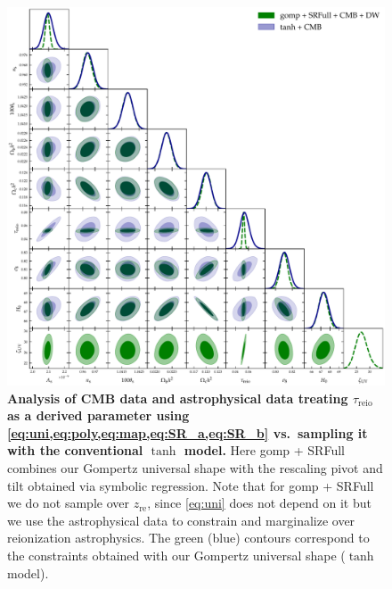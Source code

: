 \documentclass[12pt, a4paper]{article}
\newcommand{\re}{\mathrm{re}}
\newcommand{\reio}{\mathrm{reio}}
\begin{document}
\begin{figure}
\centering
\includegraphics[width=\linewidth]{figs/gomp1dw_tanh_triangle_kill_full.pdf}
\caption{\textbf{\boldmath Analysis of CMB data and astrophysical data
treating $\tau_\reio$ as a derived parameter using
\cref{eq:uni,eq:poly,eq:map,eq:SR_a,eq:SR_b} vs.\ sampling it with the
conventional $\tanh$ model.}
Here gomp + SRFull combines our Gompertz universal shape with the
rescaling pivot and tilt obtained via symbolic regression.
Note that for gomp + SRFull we do not sample over $z_\re$, since
\cref{eq:uni} does not depend on it but we use the astrophysical data to
constrain and marginalize over reionization astrophysics.
The green (blue) contours correspond to the constraints obtained with
our Gompertz universal shape ($\tanh$ model).}
\label{fig:unleashed_gomp}
\end{figure}
\end{document}

